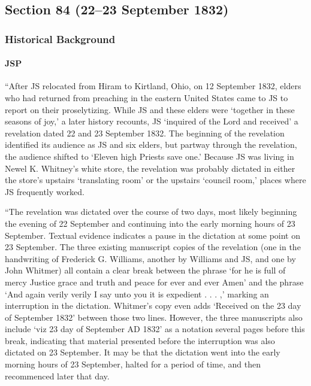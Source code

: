 \subsection{Section 84 (22--23 September 1832)}
	\label{DC84}
	
	\subsubsection{Historical Background}
		\label{DC84-HB}
		
		\paragraph{JSP}
		
			``After JS relocated from Hiram to Kirtland, Ohio, on 12 September 1832, elders who had returned from preaching in the eastern United States came to JS to report on their proselytizing. While JS and these elders were `together in these seasons of joy,' a later history recounts, JS `inquired of the Lord and received' a revelation dated 22 and 23 September 1832. The beginning of the revelation identified its audience as JS and six elders, but partway through the revelation, the audience shifted to `Eleven high Priests save one.' Because JS was living in Newel K. Whitney's white store, the revelation was probably dictated in either the store's upstairs `translating room' or the upstairs `council room,' places where JS frequently worked.

			``The revelation was dictated over the course of two days, most likely beginning the evening of 22 September and continuing into the early morning hours of 23 September. Textual evidence indicates a pause in the dictation at some point on 23 September. The three existing manuscript copies of the revelation (one in the handwriting of Frederick G. Williams, another by Williams and JS, and one by John Whitmer) all contain a clear break between the phrase `for he is full of mercy Justice grace and truth and peace for ever and ever Amen' and the phrase `And again verily verily I say unto you it is expedient . . . ,' marking an interruption in the dictation. Whitmer's copy even adds `Received on the 23 day of September 1832' between those two lines. However, the three manuscripts also include `viz 23 day of September AD 1832' as a notation several pages before this break, indicating that material presented before the interruption was also dictated on 23 September. It may be that the dictation went into the early morning hours of 23 September, halted for a period of time, and then recommenced later that day.


